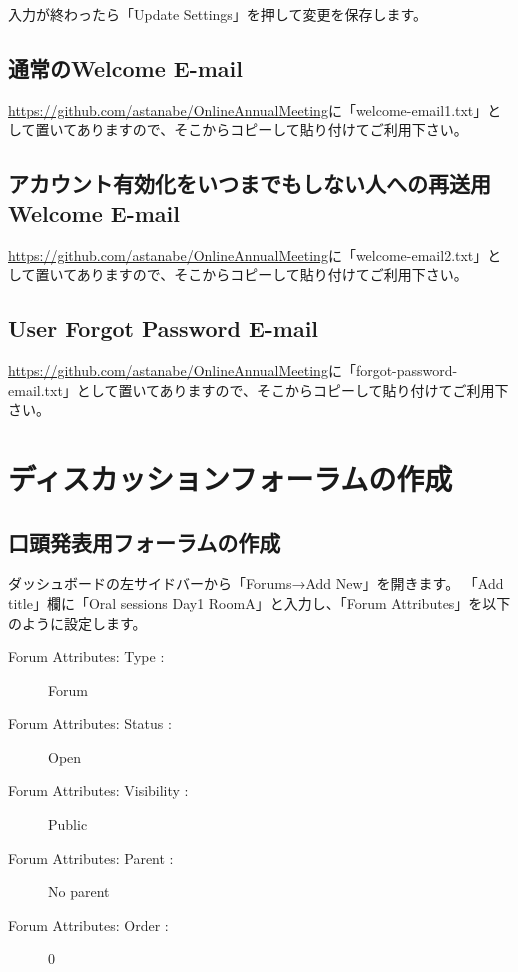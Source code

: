 \documentclass[titlepage,10pt,a4paper,uplatex]{jsbook}
\begin{document}
入力が終わったら「Update Settings」を押して変更を保存します。

\subsection{通常のWelcome E-mail}

\url{https://github.com/astanabe/OnlineAnnualMeeting}に「welcome-email1.txt」として置いてありますので、そこからコピーして貼り付けてご利用下さい。

\subsection{アカウント有効化をいつまでもしない人への再送用Welcome E-mail}

\url{https://github.com/astanabe/OnlineAnnualMeeting}に「welcome-email2.txt」として置いてありますので、そこからコピーして貼り付けてご利用下さい。

\subsection{User Forgot Password E-mail}

\url{https://github.com/astanabe/OnlineAnnualMeeting}に「forgot-password-email.txt」として置いてありますので、そこからコピーして貼り付けてご利用下さい。

\section{ディスカッションフォーラムの作成}

\subsection{口頭発表用フォーラムの作成}

ダッシュボードの左サイドバーから「Forums→Add New」を開きます。
「Add title」欄に「Oral sessions Day1 RoomA」と入力し、「Forum Attributes」を以下のように設定します。

\begin{description}
\item[Forum Attributes: Type : ] Forum
\item[Forum Attributes: Status : ] Open
\item[Forum Attributes: Visibility : ] Public
\item[Forum Attributes: Parent : ] No parent
\item[Forum Attributes: Order : ] 0
\end{description}
\end{document}
